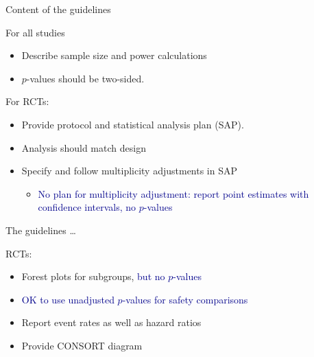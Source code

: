 \documentclass[ignorenonframetext,]{beamer}
\providecommand{\tightlist}{%
  \setlength{\itemsep}{0pt}\setlength{\parskip}{0pt}}
\begin{document}
\begin{frame}{Content of the guidelines}
\protect\hypertarget{content-of-the-guidelines}{}

For all studies

\begin{itemize}
\item
  Describe sample size and power calculations
\item
  \(p\)-values should be two-sided.
\end{itemize}

For RCTs:

\begin{itemize}
\item
  Provide protocol and statistical analysis plan (SAP).
\item
  Analysis should match design
\item
  Specify and follow multiplicity adjustments in SAP

  \begin{itemize}
  \tightlist
  \item
    \textcolor{darkblue}{No plan for multiplicity adjustment: report point estimates with confidence intervals, no $p$-values}
  \end{itemize}
\end{itemize}

\end{frame}

\begin{frame}{The guidelines \ldots}
\protect\hypertarget{the-guidelines}{}

RCTs:

\begin{itemize}
\item
  Forest plots for subgroups, \textcolor{darkblue}{but no $p$-values}
\item
  \textcolor{darkblue}{OK to use unadjusted $p$-values for safety comparisons}
\item
  Report event rates as well as hazard ratios
\item
  Provide CONSORT diagram
\end{itemize}

\end{frame}
\end{document}
